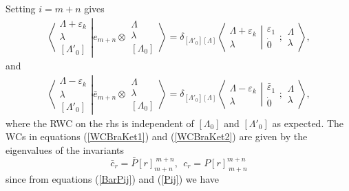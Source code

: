 \documentclass[12pt]{article}
\begin{document}
Setting $i=m+n$ gives
\begin{align}
\left\langle\left. 
\begin{array}{c} \Lambda+\varepsilon_k\\ \lambda \\ {[\Lambda'_0]} \end{array}
\right|\right.
\left.
e_{m+n} \otimes \begin{array}{c} \Lambda \\ \lambda \\
{[\Lambda_0]} \end{array}
\right\rangle = \delta_{[\Lambda'_0][\Lambda]}
 \left\langle\left. 
\begin{array}{c} \Lambda+\varepsilon_k\\ \lambda \end{array}
\right|\right.
\left.
\begin{array}{c} 
\varepsilon_1 \\ \dot{0}
\end{array}
;
\begin{array}{c} \Lambda \\ 
\lambda \end{array}
\right\rangle  , \label{WCBraKet1}
\end{align}
and
\begin{align}
\left\langle\left. 
\begin{array}{c} \Lambda-\varepsilon_k\\ \lambda \\ {[\Lambda'_0]} \end{array}
\right|\right.
\left.
\bar{e}_{m+n} \otimes \begin{array}{c} \Lambda \\ \lambda \\
{[\Lambda_0]} \end{array}
\right\rangle = \delta_{[\Lambda'_0][\Lambda]}
 \left\langle\left. 
\begin{array}{c} \Lambda-\varepsilon_k\\ \lambda \end{array}
\right|\right.
\left.
\begin{array}{c} 
\bar{\varepsilon}_1 \\ \dot{0}
\end{array}
;
\begin{array}{c} \Lambda \\
\lambda \end{array}
\right\rangle  , \label{WCBraKet2}
\end{align}
where the RWC on the rhs is independent of $[\Lambda_0]$ and $[\Lambda'_0]$ as expected. 
The WCs in equations (\ref{WCBraKet1}) and (\ref{WCBraKet2}) are given by the eigenvalues of the invariants
$$ 
\bar{c}_r = \bar{P}[r]_{m+n}^{\ m+n}, ~~c_r = P[r]_{\ m+n}^{m+n}
$$
since from equations (\ref{BarPij}) and (\ref{Pij}) we have
\end{document}

